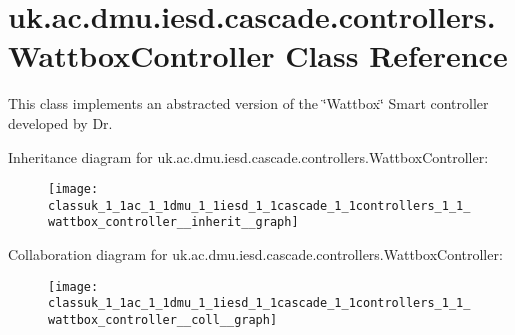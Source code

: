 \hypertarget{classuk_1_1ac_1_1dmu_1_1iesd_1_1cascade_1_1controllers_1_1_wattbox_controller}{\section{uk.\-ac.\-dmu.\-iesd.\-cascade.\-controllers.\-Wattbox\-Controller Class Reference}
\label{classuk_1_1ac_1_1dmu_1_1iesd_1_1cascade_1_1controllers_1_1_wattbox_controller}
}


This class implements an abstracted version of the \char`\"{}\-Wattbox\char`\"{} Smart controller developed by Dr.  




Inheritance diagram for uk.\-ac.\-dmu.\-iesd.\-cascade.\-controllers.\-Wattbox\-Controller\-:\nopagebreak
\begin{figure}[H]
\begin{center}
\leavevmode
\texttt{[image: classuk\_1\_1ac\_1\_1dmu\_1\_1iesd\_1\_1cascade\_1\_1controllers\_1\_1\_wattbox\_controller\_\_inherit\_\_graph]}
\end{center}
\end{figure}


Collaboration diagram for uk.\-ac.\-dmu.\-iesd.\-cascade.\-controllers.\-Wattbox\-Controller\-:\nopagebreak
\begin{figure}[H]
\begin{center}
\leavevmode
\texttt{[image: classuk\_1\_1ac\_1\_1dmu\_1\_1iesd\_1\_1cascade\_1\_1controllers\_1\_1\_wattbox\_controller\_\_coll\_\_graph]}
\end{center}
\end{figure}
